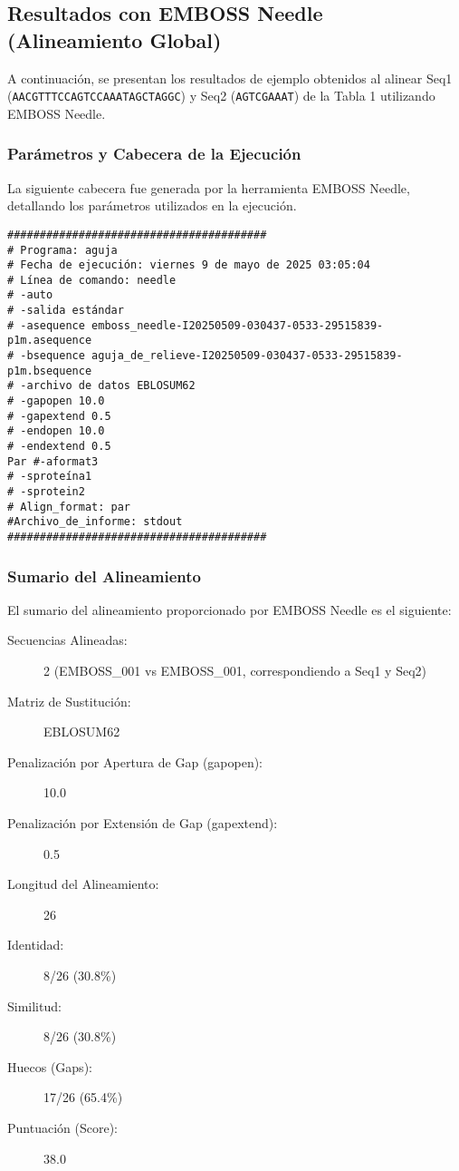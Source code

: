 \documentclass[fleqn,10pt]{article}
\begin{document}
\subsection*{Resultados con EMBOSS Needle (Alineamiento Global)}
A continuación, se presentan los resultados de ejemplo obtenidos al alinear Seq1 (\texttt{AACGTTTCCAGTCCAAATAGCTAGGC}) y Seq2 (\texttt{AGTCGAAAT}) de la Tabla 1 utilizando EMBOSS Needle.

\subsubsection*{Parámetros y Cabecera de la Ejecución}
La siguiente cabecera fue generada por la herramienta EMBOSS Needle, detallando los parámetros utilizados en la ejecución.
\begin{lstlisting}[style=outputstyle, caption={Cabecera del resultado de EMBOSS Needle (ejemplo Seq1 vs Seq2)}, basicstyle=\ttfamily\tiny, columns=flexible]
########################################
# Programa: aguja
# Fecha de ejecución: viernes 9 de mayo de 2025 03:05:04
# Línea de comando: needle
# -auto
# -salida estándar
# -asequence emboss_needle-I20250509-030437-0533-29515839-p1m.asequence
# -bsequence aguja_de_relieve-I20250509-030437-0533-29515839-p1m.bsequence
# -archivo de datos EBLOSUM62
# -gapopen 10.0
# -gapextend 0.5
# -endopen 10.0
# -endextend 0.5
Par #-aformat3
# -sproteína1
# -sprotein2
# Align_format: par
#Archivo_de_informe: stdout
########################################
\end{lstlisting}

\subsubsection*{Sumario del Alineamiento}
El sumario del alineamiento proporcionado por EMBOSS Needle es el siguiente:
\begin{description}
    \item[Secuencias Alineadas:] 2 (EMBOSS\_001 vs EMBOSS\_001, correspondiendo a Seq1 y Seq2)
    \item[Matriz de Sustitución:] EBLOSUM62
    \item[Penalización por Apertura de Gap (gapopen):] 10.0
    \item[Penalización por Extensión de Gap (gapextend):] 0.5
    \item[Longitud del Alineamiento:] 26
    \item[Identidad:] 8/26 (30.8\%)
    \item[Similitud:] 8/26 (30.8\%)
    \item[Huecos (Gaps):] 17/26 (65.4\%)
    \item[Puntuación (Score):] 38.0
\end{description}
\end{document}
